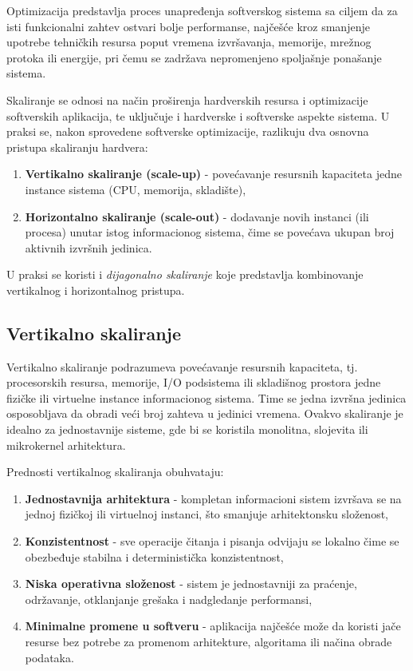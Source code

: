 \begin{definicija}
Optimizacija predstavlja proces unapređenja softverskog sistema sa ciljem da za isti funkcionalni zahtev ostvari bolje performanse, najčešće kroz smanjenje upotrebe tehničkih resursa poput vremena izvršavanja, memorije, mrežnog protoka ili energije, pri čemu se zadržava nepromenjeno spoljašnje ponašanje sistema.
\end{definicija}

Skaliranje se odnosi na način proširenja hardverskih resursa i optimizacije softverskih aplikacija, te uključuje i hardverske i softverske aspekte sistema. U praksi se, nakon sprovedene softverske optimizacije, razlikuju dva osnovna pristupa skaliranju hardvera:
\begin{enumerate}
\item \textbf{Vertikalno skaliranje (scale-up)} - povećavanje resursnih kapaciteta jedne instance sistema (CPU, memorija, skladište),
\item \textbf{Horizontalno skaliranje (scale-out)} - dodavanje novih instanci (ili procesa) unutar istog informacionog sistema, čime se povećava ukupan broj aktivnih izvršnih jedinica.
\end{enumerate}

U praksi se koristi i \textit{dijagonalno skaliranje} koje predstavlja kombinovanje vertikalnog i horizontalnog pristupa.

\subsection{Vertikalno skaliranje}
Vertikalno skaliranje podrazumeva povećavanje resursnih kapaciteta, tj. procesorskih resursa, memorije, I/O podsistema ili skladišnog prostora jedne fizičke ili virtuelne instance informacionog sistema. Time se jedna izvršna jedinica osposobljava da obradi veći broj zahteva u jedinici vremena. Ovakvo skaliranje je idealno za jednostavnije sisteme, gde bi se koristila monolitna, slojevita ili mikrokernel arhitektura.

Prednosti vertikalnog skaliranja obuhvataju:
\begin{enumerate}
\item \textbf{Jednostavnija arhitektura} - kompletan informacioni sistem izvršava se na jednoj fizičkoj ili virtuelnoj instanci, što smanjuje arhitektonsku složenost,
\item \textbf{Konzistentnost} - sve operacije čitanja i pisanja odvijaju se lokalno čime se obezbeđuje stabilna i deterministička konzistentnost,
\item \textbf{Niska operativna složenost} - sistem je jednostavniji za praćenje, održavanje, otklanjanje grešaka i nadgledanje performansi,
\item \textbf{Minimalne promene u softveru} - aplikacija najčešće može da koristi jače resurse bez potrebe za promenom arhitekture, algoritama ili načina obrade podataka.
\end{enumerate}


